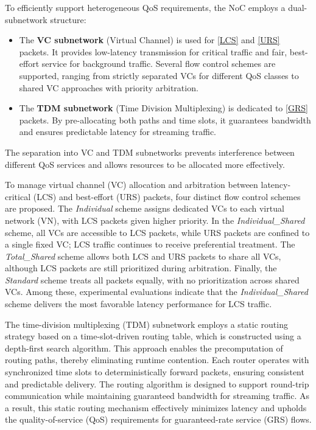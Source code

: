 To efficiently support heterogeneous QoS requirements, the NoC employs a dual-subnetwork structure:
\begin{itemize}
    \item The \textbf{VC subnetwork}\label{VC} (Virtual Channel) is used for \ref{LCS} and \ref{URS} packets. It provides low-latency transmission for critical traffic and fair, best-effort service for background traffic. Several flow control schemes are supported, ranging from strictly separated VCs for different QoS classes to shared VC approaches with priority arbitration.
    \item The \textbf{TDM subnetwork}\label{TDM} (Time Division Multiplexing) is dedicated to \ref{GRS} packets. By pre-allocating both paths and time slots, it guarantees bandwidth and ensures predictable latency for streaming traffic.
\end{itemize}
The separation into VC and TDM subnetworks prevents interference between different QoS services and allows resources to be allocated more effectively.


To manage virtual channel (VC) allocation and arbitration between latency-critical (LCS) and best-effort (URS) packets, four distinct flow control schemes are proposed. The \textit{Individual} scheme assigns dedicated VCs to each virtual network (VN), with LCS packets given higher priority. In the \textit{Individual\_Shared} scheme, all VCs are accessible to LCS packets, while URS packets are confined to a single fixed VC; LCS traffic continues to receive preferential treatment. The \textit{Total\_Shared} scheme allows both LCS and URS packets to share all VCs, although LCS packets are still prioritized during arbitration. Finally, the \textit{Standard} scheme treats all packets equally, with no prioritization across shared VCs. Among these, experimental evaluations indicate that the \textit{Individual\_Shared} scheme delivers the most favorable latency performance for LCS traffic.


The time-division multiplexing (TDM) subnetwork employs a static routing strategy based on a time-slot-driven routing table, which is constructed using a depth-first search algorithm. This approach enables the precomputation of routing paths, thereby eliminating runtime contention. Each router operates with synchronized time slots to deterministically forward packets, ensuring consistent and predictable delivery. The routing algorithm is designed to support round-trip communication while maintaining guaranteed bandwidth for streaming traffic. As a result, this static routing mechanism effectively minimizes latency and upholds the quality-of-service (QoS) requirements for guaranteed-rate service (GRS) flows.


